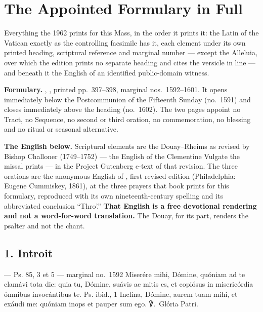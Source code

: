 \section*{The Appointed Formulary in Full}

Everything the 1962  prints for this Mass, in the order
it prints it: the Latin of the Vatican  exactly as the
controlling facsimile has it, each element under its own printed heading,
scriptural reference and marginal number --- except the Alleluia, over which the
edition prints no separate heading and cites the versicle in line --- and
beneath it the English of an identified public-domain witness.

\textbf{Formulary.} ,
, printed pp.~397--398, marginal nos.\ 1592--1601. It opens
immediately below the Postcommunion of the Fifteenth Sunday (no.\ 1591) and
closes immediately above the heading  (no.\ 1602). The
two pages appoint no Tract, no Sequence, no second or third oration, no
commemoration, no blessing and no ritual or seasonal alternative.

\textbf{The English below.} Scriptural elements are the Douay--Rheims as
revised by Bishop Challoner (1749--1752) --- the English of the Clementine
Vulgate the missal prints --- in the Project Gutenberg e-text of that revision.
The three orations are the anonymous English of , first revised
edition (Philadelphia: Eugene Cummiskey, 1861), at the three prayers that book
prints for this formulary, reproduced with its own nineteenth-century
spelling and its abbreviated conclusion ``Thro'.'' \textbf{That English is a
free devotional rendering and not a word-for-word translation.} The Douay, for
its part, renders the psalter and not the chant.

\elementguard
\subsection*{1. Introit }

\begin{appointedlatin}{ --- Ps. 85, 3 et 5 --- marginal no.\ 1592}
Miserére mihi, Dómine, quóniam ad te clamávi tota die: quia tu, Dómine, suávis
ac mitis es, et copiósus in misericórdia ómnibus invocántibus te.
\textnormal{Ps. ibid., 1} Inclína, Dómine, aurem tuam mihi, et exáudi me:
quóniam inops et pauper sum ego. ℣.~Glória Patri.
\end{appointedlatin}

